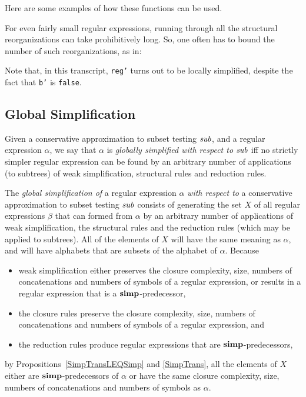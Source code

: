 Here are some examples of how these functions can be used.

For even fairly small regular expressions, running through all the
structural reorganizations can take prohibitively long.  So, one
often has to bound the number of such reorganizations, as in:

Note that, in this transcript, \texttt{reg'} turns out to be
locally simplified, despite the fact that \texttt{b'} is \texttt{false}.
%
%
%

\subsection*{Global Simplification}

%
%
%

Given a conservative approximation to subset testing ${\it sub}$, and a
%
regular expression $\alpha$, we say that $\alpha$ is \emph{globally
  simplified with respect to} ${\it sub}$ iff no strictly simpler regular
expression can be found by an arbitrary number of applications (to
subtrees) of weak simplification, structural rules and reduction
rules.

The \emph{global simplification of} a regular expression $\alpha$
\emph{with respect to} a conservative approximation to subset testing
${\it sub}$ consists of generating the set $X$ of all regular expressions
$\beta$ that can formed from $\alpha$ by an arbitrary number of
applications of weak simplification, the structural rules and the
reduction rules (which may be applied to subtrees). All of the
elements of $X$ will have the same meaning as $\alpha$, and will have
alphabets that are subsets of the alphabet of $\alpha$. Because
\begin{itemize}
\item weak simplification either preserves the closure complexity,
  size, numbers of concatenations and numbers of symbols of a regular
  expression, or results in a regular expression that is a
  $\mathrel{\mathbf{simp}}$-predecessor,

\item the closure rules preserve the closure complexity,
  size, numbers of concatenations and numbers of symbols of a regular
  expression, and

\item the reduction rules produce regular expressions that are
  $\mathrel{\mathbf{simp}}$-predecessors,
\end{itemize}
by Propositions~\ref{SimpTransLEQSimp} and \ref{SimpTrans}, all the
elements of $X$ either are ${\mathrel{\mathbf{simp}}}$-predecessors of $\alpha$ or have
the same closure complexity, size, numbers of concatenations and
numbers of symbols as $\alpha$.

